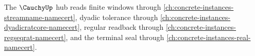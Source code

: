 The $\CauchyUp$ hub reads finite windows through \autoref{ch:concrete-instances-streamname-namecert}, dyadic tolerance through \autoref{ch:concrete-instances-dyadicratcore-namecert}, regular readback through \autoref{ch:concrete-instances-regseqrat-namecert}, and the terminal seal through \autoref{ch:concrete-instances-real-namecert}.









